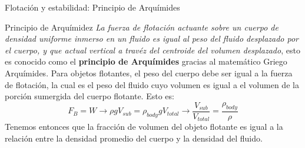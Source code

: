 \documentclass [xcolor=svgnames, t] {beamer}
\begin{document}
\begin{frame}{Flotaci\'on y estabilidad: Principio de Arqu\'imides}
\vspace{-0.5cm}
\begin{block}{Principio de Arqu\'imidez}
\emph{La fuerza de flotaci\'on actuante sobre un cuerpo de densidad uniforme inmerso en un fluido es igual al peso del fluido desplazado por el cuerpo, y que actual vertical a trav\'ez del centroide del volumen desplazado}, esto es conocido como el \textbf{principio de Arqu\'imides} gracias al matem\'atico Griego Arqu\'imides. 
Para objetos flotantes, el peso del cuerpo debe ser igual a la fuerza de flotaci\'on, la cual es el peso del fluido cuyo volumen es igual a el volumen de la porci\'on sumergida del cuerpo flotante. Esto es:
$$
F_B = W \rightarrow \rho g V_{sub} = \rho_{body}gV_{total} \rightarrow \frac{V_{sub}}{V_{total}} = \frac{\rho_{body}}{\rho}
$$
Tenemos entonces que la fracci\'on de volumen del objeto flotante es igual a la relaci\'on entre la densidad promedio del cuerpo y la densidad del fluido. 
\end{block}
\end{frame}
\end{document}
